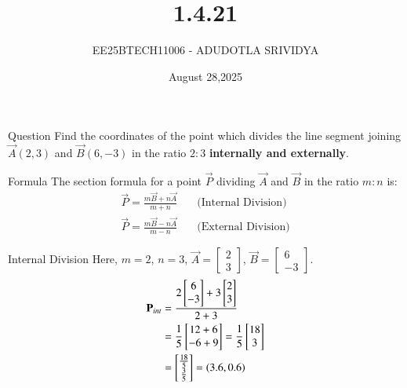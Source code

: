 \documentclass{beamer}
\title{1.4.21}
\date{August 28,2025}
\author{EE25BTECH11006 - ADUDOTLA SRIVIDYA}
\begin{document}
\frame{\titlepage}

\begin{frame}{Question}
Find the coordinates of the point which divides the line segment joining $\vec{A}(2,3)$ and $\vec{B}(6,-3)$ in the ratio $2:3$ \textbf{internally and externally}.
\end{frame}

\begin{frame}{Formula}
The section formula for a point $\vec{P}$ dividing $\vec{A}$ and $\vec{B}$ in the ratio $m:n$ is:
\begin{align}
\vec{P} = \frac{m\vec{B}+n\vec{A}}{m+n} \quad &\text{(Internal Division)} \\
\vec{P} = \frac{m\vec{B}-n\vec{A}}{m-n} \quad &\text{(External Division)}
\end{align}
\end{frame}

\begin{frame}{Internal Division}
Here, $m=2$, $n=3$, $\vec{A}=\begin{bmatrix}2\\3\end{bmatrix}$, $\vec{B}=\begin{bmatrix}6\\-3\end{bmatrix}$.
\begin{align}
\vec{P}_{int} &= \frac{2\begin{bmatrix}6\\-3\end{bmatrix}+3\begin{bmatrix}2\\3\end{bmatrix}}{2+3} \\
&= \frac{1}{5}\begin{bmatrix}12+6 \\ -6+9\end{bmatrix} = \frac{1}{5}\begin{bmatrix}18\\3\end{bmatrix} \\
&= \begin{bmatrix} \tfrac{18}{5} \\ \tfrac{3}{5} \end{bmatrix} = \brak{3.6, 0.6}
\end{align}
\end{frame}
\end{document}
